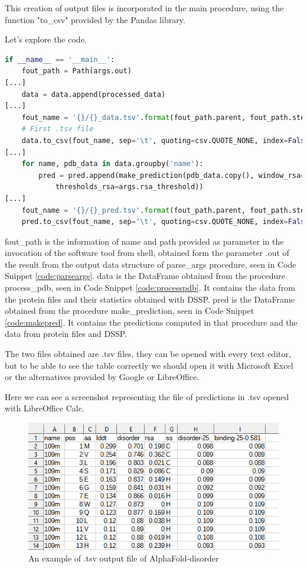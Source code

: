 This creation of output files is incorporated in the main procedure, using the function "to\_csv" provided by the Pandas library. 

Let's explore the code.

\begin{lstlisting}[language=Python, caption=Creation of output files]
if __name__ == '__main__':
    fout_path = Path(args.out)
[...]
    data = data.append(processed_data)
[...]
    fout_name = '{}/{}_data.tsv'.format(fout_path.parent, fout_path.stem)
    # First .tsv file
    data.to_csv(fout_name, sep='\t', quoting=csv.QUOTE_NONE, index=False, float_format='%.3f')
[...]
    for name, pdb_data in data.groupby('name'):
        pred = pred.append(make_prediction(pdb_data.copy(), window_rsa=args.rsa_window,
            thresholds_rsa=args.rsa_threshold))
[...]
    fout_name = '{}/{}_pred.tsv'.format(fout_path.parent, fout_path.stem)
    pred.to_csv(fout_name, sep='\t', quoting=csv.QUOTE_NONE, index=False, float_format='%.3f')
\end{lstlisting}

fout\_path is the information of name and path provided as parameter in the invocation of the software tool from shell, obtained form the parameter .out of the result from the output data structure of parse\_args procedure, seen in Code Snippet \ref{code:parseargs}.
data is the DataFrame obtained from the procedure process\_pdb, seen in Code Snippet \ref{code:processpdb}. It contains the data from the protein files and their statistics obtained with DSSP.
pred is the DataFrame obtained from the procedure make\_prediction, seen in Code Snippet \ref{code:makepred}. It contains the predictions computed in that procedure and the data from protein files and DSSP.

The two files obtained are .tsv files, they can be opened with every text editor, but to be able to see the table correctly we should open it with Microsoft Excel or the alternatives provided by Google or LibreOffice.

Here we can see a screenshot representing the file of predictions in .tsv opened with LibreOffice Calc.

\vspace{2em}

\begin{figure}[h!]
    \centering
    \includegraphics[scale=1.1]{res/code/example_tsv.png}
    \caption{An example of .tsv output file of AlphaFold-disorder}
\end{figure}
\vspace{15em}

